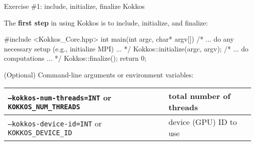 
\begin{frame}[fragile]{Exercise \#1: include, initialize, finalize Kokkos}

  The \textbf{first step} in using Kokkos is to include, initialize, and finalize:

  \begin{code}
#include <Kokkos_Core.hpp>
int main(int argc, char* argv[]) {
  /* ... do any necessary setup (e.g., initialize MPI) ... */
  Kokkos::initialize(argc, argv);
  {
  /* ... do computations ... */
  }
  Kokkos::finalize();
  return 0;
}
  \end{code}

  \vspace{7pt}

  (Optional) Command-line arguments or environment variables:

  \vspace{3pt}

	\begin{tabular}{| p{} | p{} |}
    \hline
	  \texttt{--kokkos-num-threads=INT} or \texttt{KOKKOS\_NUM\_THREADS} & total number of threads \\
    \hline
	  \texttt{--kokkos-device-id=INT} or \texttt{KOKKOS\_DEVICE\_ID} & device (GPU) ID to use \\
    \hline
  \end{tabular}

\end{frame}



